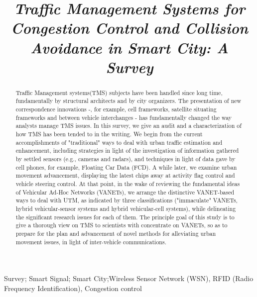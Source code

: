 \documentclass[conference]{IEEEtran}
\begin{document}
\title{\textit{Traffic Management Systems for Congestion Control and Collision Avoidance
in Smart City: A Survey}}

\author{
\and
{}
}

\maketitle

\begin{abstract}
Traffic Management systems(TMS) subjects have been handled since long time, fundamentally by structural architects and by city organizers. The presentation of new correspondence innovations -, for example, cell frameworks, satellite situating frameworks and between vehicle interchanges - has fundamentally changed the way analysts manage TMS issues. In this survey, we give an audit and a characterization of how TMS has been tended to in the writing. We begin from the current accomplishments of "traditional" ways to deal with urban traffic estimation and enhancement, including strategies in light of the investigation of information gathered by settled sensors (e.g., cameras and radars), and techniques in light of data gave by cell phones, for example, Floating Car Data (FCD). A while later, we examine urban movement advancement, displaying the latest chips away at activity flag control and vehicle steering control. At that point, in the wake of reviewing the fundamental ideas of Vehicular Ad-Hoc Networks (VANETs), we arrange the distinctive VANET-based ways to deal with UTM, as indicated by three classifications ("immaculate" VANETs, hybrid vehicular-sensor systems and hybrid vehicular-cell systems), while delineating the significant research issues for each of them. The principle goal of this study is to give a thorough view on TMS to scientists with concentrate on VANETs, so as to prepare for the plan and advancement of novel methods for alleviating urban movement issues, in light of inter-vehicle communications. 
\end{abstract}

\begin{IEEEkeywords}
Survey; Smart Signal; Smart City;Wireless Sensor Network (WSN), RFID (Radio Frequency
Identification), Congestion control
\end{IEEEkeywords}
\end{document}
